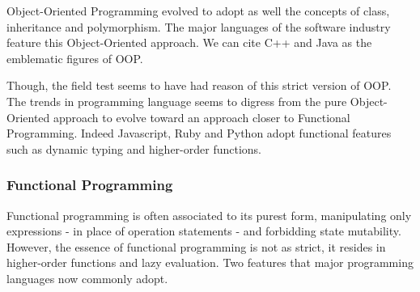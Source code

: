 
Object-Oriented Programming evolved to adopt as well the concepts of class, inheritance and polymorphism.
The major languages of the software industry feature this Object-Oriented approach.
We can cite C++ and Java as the emblematic figures of OOP.

Though, the field test seems to have had reason of this strict version of OOP.
The trends in programming language seems to digress from the pure Object-Oriented approach to evolve toward an approach closer to Functional Programming.
Indeed Javascript, Ruby and Python adopt functional features such as dynamic typing and higher-order functions.








\subsubsection{Functional Programming}


Functional programming is often associated to its purest form, manipulating only expressions - in place of operation statements - and forbidding state mutability.
However, the essence of functional programming is not as strict, it resides in higher-order functions and lazy evaluation.
Two features that major programming languages now commonly adopt.


